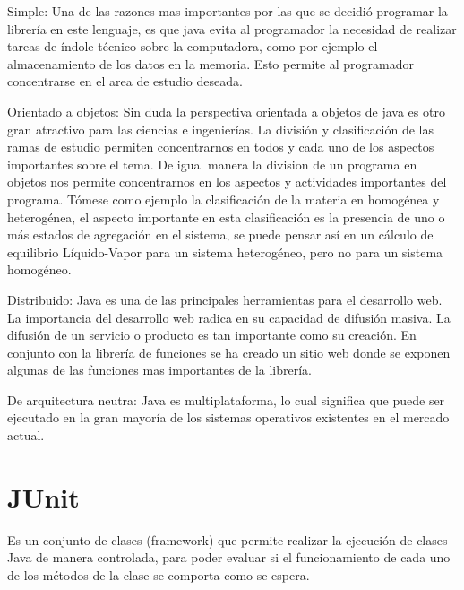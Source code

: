 		\begin{description}
		\item{Simple:} Una de las razones mas importantes por las que se decidió programar la librería en este lenguaje, es que java evita al programador la necesidad de realizar tareas de índole técnico sobre la computadora, como por ejemplo el almacenamiento de los datos en la memoria. Esto permite al programador concentrarse en el area de estudio deseada.

		\item{Orientado a objetos:}
		Sin duda la perspectiva orientada a objetos de java es otro gran atractivo para las ciencias e ingenierías. La división y clasificación de las ramas de estudio permiten concentrarnos en todos y cada uno de los aspectos importantes sobre el tema. De igual manera la division de un programa en objetos nos permite concentrarnos en los aspectos y actividades importantes del programa. Tómese como ejemplo la clasificación de la materia en homogénea y heterogénea, el aspecto importante en esta clasificación es la presencia de uno o más estados de agregación en el sistema, se puede pensar así en un cálculo de equilibrio Líquido-Vapor para un sistema heterogéneo, pero no para un sistema homogéneo.

		\item{Distribuido:}
		Java es una de las principales herramientas para el desarrollo web. La importancia del desarrollo web radica en su capacidad de difusión masiva. La difusión de un servicio o producto es tan importante como su creación. En conjunto con la librería de funciones se ha creado un sitio web donde se exponen algunas de las funciones mas importantes de la librería.

		\item{De arquitectura neutra:}
		Java es multiplataforma, lo cual significa que puede ser ejecutado en la gran mayoría de los sistemas operativos existentes en el mercado actual.

		\end{description}

	\section{JUnit}

		Es un conjunto de clases (framework) que permite realizar la ejecución de clases Java de manera controlada, para poder evaluar si el funcionamiento de cada uno de los métodos de la clase se comporta como se espera.


